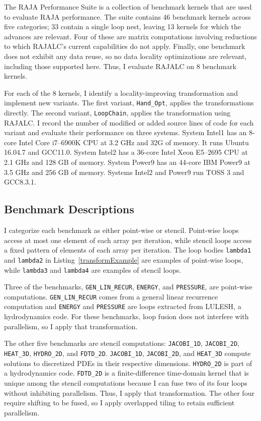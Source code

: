 The RAJA Performance Suite is a collection of benchmark kernels that are
used to evaluate RAJA performance.
The suite contains 46 benchmark kernels across five categories; 33 contain
a single loop nest, leaving 13 kernels for which the advances are relevant.
Four of these are matrix computations involving reductions to which 
RAJALC's current capabilities do not apply. 
Finally, one benchmark does not exhibit any data reuse, so no data locality 
optimizations are relevant, including those supported here. 
Thus, I evaluate RAJALC on 8 benchmark kernels.

For each of the 8 kernels, I identify a locality-improving transformation
and implement new variants.
The first variant, \verb.Hand_Opt., applies the transformations directly.
The second variant, \verb.LoopChain., applies the transformation using RAJALC\@.
I record the number of modified or added source lines of code for each
variant and evaluate their performance on three systems.
System Intel1 has an 8-core Intel Core i7--6900K CPU at 3.2 GHz and 32G of memory.
It runs Ubuntu 16.04.7 and GCC11.0.
System Intel2 has a 36-core Intel Xeon E5--2695 CPU at 2.1 GHz and 128 GB of memory.
System Power9 has an 44-core IBM Power9 at 3.5 GHz and 256 GB of memory.
Systems Intel2 and Power9 run TOSS 3 and GCC8.3.1.


\subsection{Benchmark Descriptions}

I categorize each benchmark as either point-wise or stencil. 
Point-wise loops access at most one element of each array per iteration,
while stencil loops access a fixed pattern of elements of each array per
iteration. 
The loop bodies
\verb.lambda1. and \verb.lambda2. in Listing~\ref{transformExample} are
examples of point-wise loops, while \verb.lambda3. and \verb.lambda4. are
examples of stencil loops.

Three of the benchmarks, \verb.GEN_LIN_RECUR., \verb.ENERGY., and
\verb.PRESSURE., are point-wise computations.
\verb.GEN_LIN_RECUR. comes from a general linear recurrence computation and
\verb.ENERGY. and \verb.PRESSURE. are loops extracted from LULESH, a
hydrodynamics code. 
For these benchmarks, loop fusion does not interfere with parallelism, so
I apply that transformation.

The other five benchmarks are stencil computations: \verb.JACOBI_1D.,
\verb.JACOBI_2D., \verb.HEAT_3D., \verb.HYDRO_2D., and \verb.FDTD_2D..
\verb.JACOBI_1D., \verb.JACOBI_2D., and \verb.HEAT_3D. compute solutions
to discretized PDEs in their respective dimensions.
\verb.HYDRO_2D. is part of a hydrodynamics code.
\verb.FDTD_2D. is a finite-difference time-domain kernel that is unique
among the stencil computations because I can fuse two of its four loops 
without inhibiting parallelism.
Thus, I apply that transformation.
The other four require shifting to be fused, so I apply overlapped tiling
to retain sufficient parallelism.

